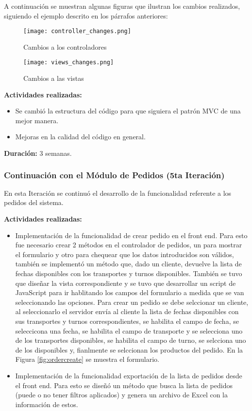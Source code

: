 A continuación se muestran algunas figuras que ilustran los cambios realizados, siguiendo el ejemplo descrito en los párrafos anteriores:

\begin{figure}[H]
    \centering
    \texttt{[image: controller\_changes.png]}
    \caption{Cambios a los controladores}
    \label{fig:controller_changes}
\end{figure}

\begin{figure}[H]
    \centering
    \texttt{[image: views\_changes.png]}
    \caption{Cambios a las vistas}
    \label{fig:views_changes}
\end{figure}


\vspace{0.3cm}
\textbf{Actividades realizadas:}
\begin{itemize}
    \item Se cambió la estructura del código para que siguiera el patrón MVC de una mejor manera.
    \item Mejoras en la calidad del código en general.
\end{itemize}

\textbf{Duración:} 3 semanas.

\subsubsection{Continuación con el Módulo de Pedidos (5ta Iteración)}
En esta Iteración se continuó el desarrollo de la funcionalidad referente a los pedidos del sistema.

\vspace{0.3cm}
\textbf{Actividades realizadas:}
\begin{itemize}
    \item Implementación de la funcionalidad de crear pedido en el front end. Para esto fue necesario crear 2 métodos en el controlador de pedidos, un para mostrar el formulario y otro para chequear que los datos introducidos son válidos, también se implementó un método que, dado un cliente, devuelve la lista de fechas disponibles con los transportes y turnos disponibles. También se tuvo que diseñar la vista correspondiente y se tuvo que desarrollar un script de JavaScript para ir hablitando los campos del formulario a medida que se van seleccionando las opciones. Para crear un pedido se debe selccionar un cliente, al seleccionarlo el servidor envía al cliente la lista de fechas disponibles con sus transportes y turnos correspondientes, se habilita el campo de fecha, se seleccicona una fecha, se habilita el campo de transporte y se selecciona uno de los transportes disponibles, se habilita el campo de turno, se selcciona uno de los disponibles y, fianlmente se selccionan los productos del pedido. En la Figura \ref{fig:ordercreate} se muestra el formulario.
    \item Implementación de la funcionalidad exportación de la lista de pedidos desde el front end. Para esto se diseñó un método que busca la lista de pedidos (puede o no tener filtros aplicados) y genera un archivo de Excel con la información de estos.
\end{itemize}

